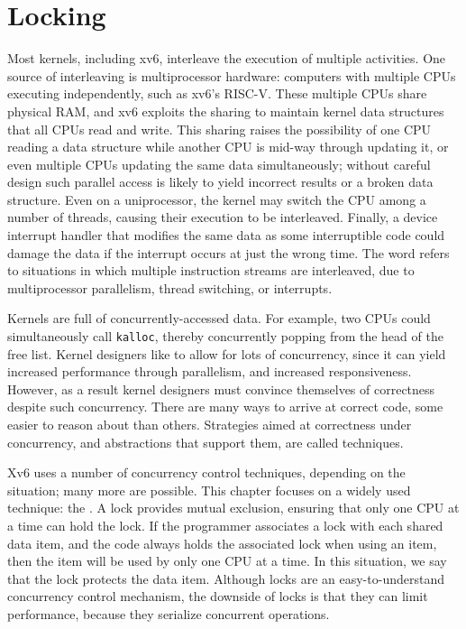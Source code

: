 \chapter{Locking}
\label{CH:LOCK}

Most kernels, including xv6, interleave the execution
of multiple activities.
One source of interleaving is multiprocessor hardware:
computers with
multiple CPUs executing independently, such as xv6's RISC-V.
These multiple CPUs share physical RAM,
and xv6 exploits the sharing to maintain kernel
data structures that all CPUs read and write.
This sharing raises the possibility of
one CPU reading a data structure while another
CPU is mid-way through updating it, or even
multiple CPUs updating the same data simultaneously;
without careful design such parallel access is likely
to yield incorrect results or a broken data structure.
Even on a uniprocessor, the kernel may switch the CPU among
a number of threads, causing their execution to be interleaved.
Finally, a device interrupt handler that modifies
the same data as some interruptible code could damage
the data if the interrupt occurs at just the wrong time.
The word 
refers to situations in which
multiple instruction streams are interleaved,
due to multiprocessor parallelism,
thread switching, or interrupts.

Kernels are full of concurrently-accessed data. For example, two CPUs
could simultaneously call {\tt kalloc}, thereby concurrently
popping from the head of the free list. Kernel designers like to allow
for lots of concurrency, since it can yield increased performance
through parallelism, and increased responsiveness. However, as a result
kernel designers must convince themselves of
correctness despite such concurrency. There are many ways to arrive at
correct code, some easier to reason about than others. Strategies
aimed at correctness under concurrency, and abstractions that support
them, are called  techniques.

Xv6 uses a number of concurrency control techniques, depending on the
situation; many more are possible. This chapter focuses on a widely
used technique: the .  A lock provides mutual
exclusion, ensuring that only one CPU at a time can hold the lock. If
the programmer associates a lock with each shared data item, and the
code always holds the associated lock when using an item, then the
item will be used by only one CPU at a time.  In this situation, we
say that the lock protects the data item.  Although locks are an
easy-to-understand concurrency control mechanism, the downside of
locks is that they can limit performance, because they serialize
concurrent operations.

